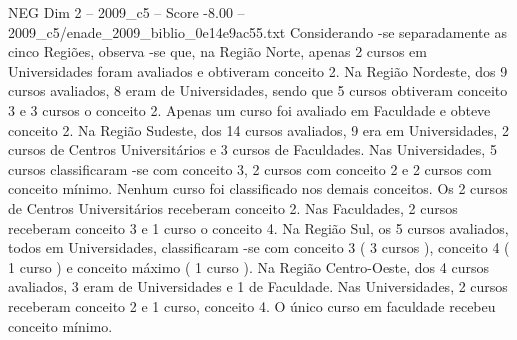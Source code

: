 \begin{textsample}{NEG Dim 2 – 2009\_c5 – Score -8.00 – 2009\_c5/enade\_2009\_biblio\_0e14e9ac55.txt}
Considerando -se separadamente as cinco Regiões, observa -se que, na Região Norte, apenas 2 cursos em Universidades foram avaliados e obtiveram conceito 2.
Na Região Nordeste, dos 9 cursos avaliados, 8 eram de Universidades, sendo que 5 cursos obtiveram conceito 3 e 3 cursos o conceito 2.
Apenas um curso foi avaliado em Faculdade e obteve conceito 2.
Na Região Sudeste, dos 14 cursos avaliados, 9 era em Universidades, 2 cursos de Centros Universitários e 3 cursos de Faculdades.
Nas Universidades, 5 cursos classificaram -se com conceito 3, 2 cursos com conceito 2 e 2 cursos com conceito mínimo.
Nenhum curso foi classificado nos demais conceitos.
Os 2 cursos de Centros Universitários receberam conceito 2.
Nas Faculdades, 2 cursos receberam conceito 3 e 1 curso o conceito 4.
Na Região Sul, os 5 cursos avaliados, todos em Universidades, classificaram -se com conceito 3 ( 3 cursos ), conceito 4 ( 1 curso ) e conceito máximo ( 1 curso ).
Na Região Centro-Oeste, dos 4 cursos avaliados, 3 eram de Universidades e 1 de Faculdade.
Nas Universidades, 2 cursos receberam conceito 2 e 1 curso, conceito 4.
O único curso em faculdade recebeu conceito mínimo.

\end{textsample}
